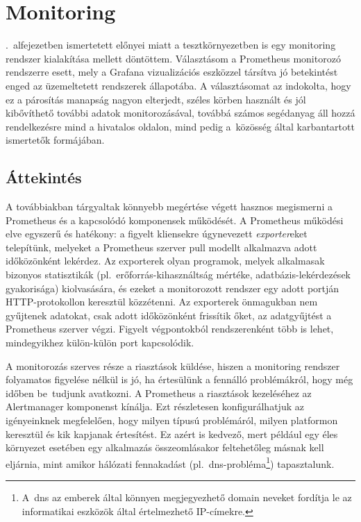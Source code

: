 
\chapter{Monitoring}
\label{chap:monitoring}
.~alfejezetben ismertetett előnyei miatt a tesztkörnyezetben is egy monitoring rendszer kialakítása mellett döntöttem. Választásom a Prometheus monitorozó rendszerre esett, mely a Grafana vizualizációs eszközzel társítva jó betekintést enged az üzemeltetett rendszerek állapotába. A választásomat az indokolta, hogy ez a párosítás manapság nagyon elterjedt, széles körben használt és jól kibővíthető további adatok monitorozásával, továbbá számos segédanyag áll hozzá rendelkezésre mind a hivatalos oldalon, mind pedig a~közösség által karbantartott ismertetők formájában.

\section{Áttekintés}
A továbbiakban tárgyaltak könnyebb megértése végett hasznos megismerni a Prometheus és a kapcsolódó komponensek működését. A Prometheus működési elve egyszerű és hatékony: a figyelt kliensekre úgynevezett \textit{exporter}eket telepítünk, melyeket a Prometheus szerver pull modellt alkalmazva adott időközönként lekérdez. Az exporterek olyan programok, melyek alkalmasak bizonyos statisztikák (pl.~erőforrás-kihasználtság mértéke, adatbázis-lekérdezések gyakorisága) kiolvasására, és ezeket a monitorozott rendszer egy adott portján HTTP-protokollon keresztül közzétenni. Az exporterek önmagukban nem gyűjtenek adatokat, csak adott időközönként frissítik őket, az adatgyűjtést a Prometheus szerver végzi. Figyelt végpontokból rendszerenként több is lehet, mindegyikhez külön-külön port kapcsolódik.

A monitorozás szerves része a riasztások küldése, hiszen a monitoring rendszer folyamatos figyelése nélkül is jó, ha értesülünk a fennálló problémákról, hogy még időben be~tudjunk avatkozni. A Prometheus a riasztások kezeléséhez az Alertmanager komponenst kínálja. Ezt részletesen konfigurálhatjuk az igényeinknek megfelelően, hogy milyen típusú problémáról, milyen platformon keresztül és kik kapjanak értesítést. Ez azért is kedvező, mert például egy éles környezet esetében egy alkalmazás összeomlásakor feltehetőleg másnak kell eljárnia, mint amikor hálózati fennakadást (pl.~\acrshort{dns}-probléma\footnote{A~\acrshort{dns} az emberek által könnyen megjegyezhető domain neveket fordítja le az informatikai eszközök által értelmezhető IP-címekre.}) tapasztalunk.

